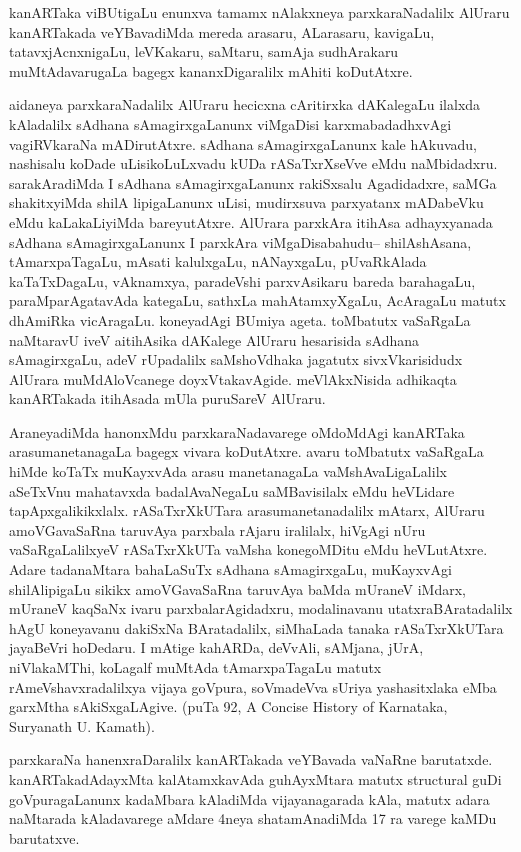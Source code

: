 \documentclass[11pt,a4size]{article}
\begin{document}
kanARTaka viBUtigaLu enunxva tamamx nAlakxneya parxkaraNadalilx
AlUraru kanARTakada veYBavadiMda mereda arasaru, ALarasaru, kavigaLu,
tatavxjAcnxnigaLu, leVKakaru, saMtaru, samAja sudhArakaru
muMtAdavarugaLa bagegx kananxDigaralilx mAhiti koDutAtxre.

aidaneya parxkaraNadalilx AlUraru hecicxna cAritirxka dAKalegaLu
ilalxda kAladalilx sAdhana sAmagirxgaLanunx viMgaDisi
karxmabadadhxvAgi vagiRVkaraNa mADirutAtxre. sAdhana sAmagirxgaLanunx
kale hAkuvadu, nashisalu koDade uLisikoLuLxvadu kUDa rASaTxrXseVve
eMdu naMbidadxru. sarakAradiMda I sAdhana sAmagirxgaLanunx rakiSxsalu
Agadidadxre, saMGa shakitxyiMda shilA lipigaLanunx uLisi, mudirxsuva
parxyatanx mADabeVku eMdu kaLakaLiyiMda bareyutAtxre. AlUrara parxkAra
itihAsa adhayxyanada sAdhana sAmagirxgaLanunx I parxkAra
viMgaDisabahudu-- shilAshAsana, tAmarxpaTagaLu, mAsati kalulxgaLu,
nANayxgaLu, pUvaRkAlada kaTaTxDagaLu, vAknamxya, paradeVshi
parxvAsikaru bareda barahagaLu, paraMparAgatavAda kategaLu, sathxLa
mahAtamxyXgaLu, AcAragaLu matutx dhAmiRka vicAragaLu. koneyadAgi
BUmiya ageta. toMbatutx vaSaRgaLa naMtaravU iveV aitihAsika dAKalege
AlUraru hesarisida sAdhana sAmagirxgaLu, adeV rUpadalilx saMshoVdhaka
jagatutx sivxVkarisidudx AlUrara muMdAloVcanege
doyxVtakavAgide. meVlAkxNisida adhikaqta kanARTakada itihAsada mUla
puruSareV AlUraru.

AraneyadiMda hanonxMdu parxkaraNadavarege oMdoMdAgi kanARTaka
arasumanetanagaLa bagegx vivara koDutAtxre. avaru toMbatutx vaSaRgaLa
hiMde koTaTx muKayxvAda arasu manetanagaLa vaMshAvaLigaLalilx aSeTxVnu
mahatavxda badalAvaNegaLu saMBavisilalx eMdu heVLidare
tapApxgalikikxlalx. rASaTxrXkUTara arasumanetanadalilx mAtarx, AlUraru
amoVGavaSaRna taruvAya parxbala rAjaru iralilalx, hiVgAgi nUru
vaSaRgaLalilxyeV rASaTxrXkUTa vaMsha konegoMDitu eMdu
heVLutAtxre. Adare tadanaMtara bahaLaSuTx sAdhana sAmagirxgaLu,
muKayxvAgi shilAlipigaLu sikikx amoVGavaSaRna taruvAya baMda mUraneV
iMdarx, mUraneV kaqSaNx ivaru parxbalarAgidadxru, modalinavanu
utatxraBAratadalilx hAgU koneyavanu dakiSxNa BAratadalilx, siMhaLada
tanaka rASaTxrXkUTara jayaBeVri hoDedaru. I mAtige kahARDa, deVvAli,
sAMjana, jUrA, niVlakaMThi, koLagalf muMtAda tAmarxpaTagaLu matutx
rAmeVshavxradalilxya vijaya goVpura, soVmadeVva sUriya yashasitxlaka
eMba garxMtha sAkiSxgaLAgive. (puTa 92, {\footnotesize{\rm{A Concise
      History of Karnataka, Suryanath U. Kamath}}}).

parxkaraNa hanenxraDaralilx kanARTakada veYBavada vaNaRne
barutatxde. kanARTakadAdayxMta kalAtamxkavAda guhAyxMtara matutx
{\footnotesize{\rm{structural}}} guDi goVpuragaLanunx kadaMbara
kAladiMda vijayanagarada kAla, matutx adara naMtarada kAladavarege
aMdare 4neya shatamAnadiMda 17 ra varege kaMDu barutatxve.
\end{document}
